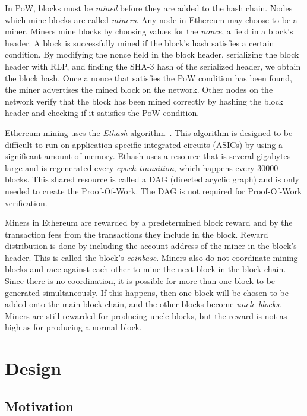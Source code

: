 \documentclass[12pt]{article}
\begin{document}
In PoW, blocks must be \emph{mined} before they are added to the hash chain. Nodes which mine blocks are called \emph{miners}. Any node in Ethereum may choose to be a miner.
Miners mine blocks by choosing values for the \emph{nonce}, a field in a block's header. A block is successfully mined if the block's hash satisfies a certain condition. By modifying the nonce field in the block header, serializing the block header with RLP, and finding the SHA-3 hash of the serialized header, we obtain the block hash. Once a nonce that satisfies the PoW condition has been found, the miner advertises the mined block on the network. Other nodes on the network verify that the block has been mined correctly by hashing the block header and checking if it satisfies the PoW condition.

Ethereum mining uses the \emph{Ethash} algorithm~\cite{ethash}. This algorithm is designed to be difficult to run on application-specific integrated circuits (ASICs) by using a significant amount of memory. Ethash uses a resource that is several gigabytes large and is regenerated every \emph{epoch transition}, which happens every 30000 blocks. This shared resource is called a DAG (directed acyclic graph) and is only needed to create the Proof-Of-Work. The DAG is not required for Proof-Of-Work verification.

Miners in Ethereum are rewarded by a predetermined block reward and by the transaction fees from the transactions they include in the block. Reward distribution is done by including the account address of the miner in the block's header. This is called the block's \emph{coinbase}. Miners also do not coordinate mining blocks and race against each other to mine the next block in the block chain. Since there is no coordination, it is possible for more than one block to be generated simultaneously. If this happens, then one block will be chosen to be added onto the main block chain, and the other blocks become \emph{uncle blocks}. Miners are still rewarded for producing uncle blocks, but the reward is not as high as for producing a normal block.


\section{Design}

\subsection{Motivation}
\end{document}
